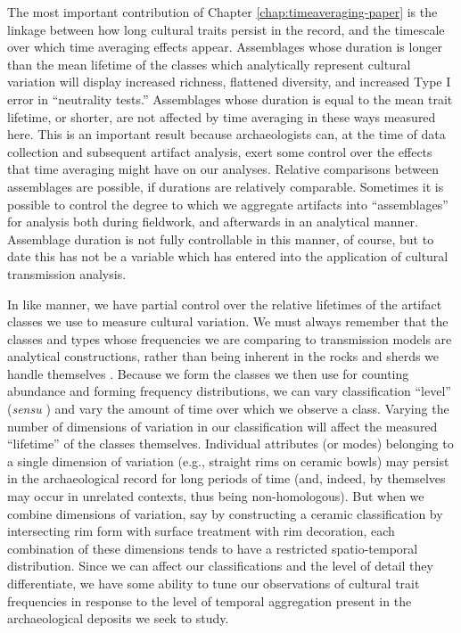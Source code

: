 The most important contribution of Chapter \ref{chap:timeaveraging-paper} is the linkage between how long cultural traits persist in the record, and the timescale over which time averaging effects appear.  Assemblages whose duration is longer than the mean lifetime of the classes which analytically represent cultural variation will display increased richness, flattened diversity, and increased Type I error in ``neutrality tests.''  Assemblages whose duration is equal to the mean trait lifetime, or shorter, are not affected by time averaging in these ways measured here.  This is an important result because archaeologists can, at the time of data collection and subsequent artifact analysis, exert some control over the effects that time averaging might have on our analyses.  Relative comparisons between assemblages are possible, if durations are relatively comparable.  Sometimes it is possible to control the degree to which we aggregate artifacts into ``assemblages'' for analysis both during fieldwork, and afterwards in an analytical manner.  Assemblage duration is not fully controllable in this manner, of course, but to date this has not be a variable which has entered into the application of cultural transmission analysis.  

In like manner, we have partial control over the relative lifetimes of the artifact classes we use to measure cultural variation.  We must always remember that the classes and types whose frequencies we are comparing to transmission models are analytical constructions, rather than being inherent in the rocks and sherds we handle themselves \citep{Dunnell1971}.  Because we form the classes we then use for counting abundance and forming frequency distributions, we can vary classification ``level'' (\emph{sensu} \citealt{Dunnell1971}) and vary the amount of time over which we observe a class.  Varying the number of dimensions of variation in our classification will affect the measured ``lifetime'' of the classes themselves.  Individual attributes (or modes) belonging to a single dimension of variation (e.g., straight rims on ceramic bowls) may persist in the archaeological record for long periods of time (and, indeed, by themselves may occur in unrelated contexts, thus being non-homologous).  But when we combine dimensions of variation, say by constructing a ceramic classification by intersecting rim form with surface treatment with rim decoration, each combination of these dimensions tends to have a restricted spatio-temporal distribution.  Since we can affect our classifications and the level of detail they differentiate, we have some ability to tune our observations of cultural trait frequencies in response to the level of temporal aggregation present in the archaeological deposits we seek to study.  

